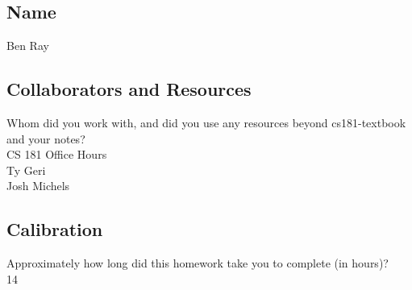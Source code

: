 \documentclass[submit]{harvardml}
\begin{document}
\newpage
\subsection*{Name}
Ben Ray

\subsection*{Collaborators and Resources}
Whom did you work with, and did you use any resources beyond cs181-textbook and your notes?\\
CS 181 Office Hours\\
Ty Geri\\
Josh Michels\\
\subsection*{Calibration}
Approximately how long did this homework take you to complete (in hours)?\\
14
\end{document}
